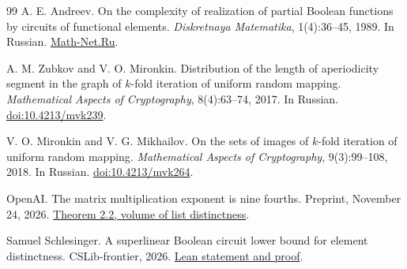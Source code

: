 \documentclass[11pt]{article}
\theoremstyle{definition}
\theoremstyle{remark}
\numberwithin{equation}{section}
\begin{document}
\begin{thebibliography}{99}
A. E. Andreev.
\newblock On the complexity of realization of partial Boolean functions
by circuits of functional elements.
\newblock \emph{Diskretnaya Matematika}, 1(4):36--45, 1989. In Russian.
\newblock \href{https://www.mathnet.ru/rus/dm939}{Math-Net.Ru}.

A. M. Zubkov and V. O. Mironkin.
\newblock Distribution of the length of aperiodicity segment in the graph
of $k$-fold iteration of uniform random mapping.
\newblock \emph{Mathematical Aspects of Cryptography}, 8(4):63--74, 2017.
In Russian. \href{https://doi.org/10.4213/mvk239}{doi:10.4213/mvk239}.

V. O. Mironkin and V. G. Mikhailov.
\newblock On the sets of images of $k$-fold iteration of uniform random mapping.
\newblock \emph{Mathematical Aspects of Cryptography}, 9(3):99--108, 2018.
In Russian. \href{https://doi.org/10.4213/mvk264}{doi:10.4213/mvk264}.

OpenAI.
\newblock The matrix multiplication exponent is nine fourths.
\newblock Preprint, November 24, 2026.
\href{https://github.com/openai/math/blob/3344da59991ed94f9ba711217b29c1d760badfa6/preprints/The-matrix-multiplication-exponent-is-nine-fourths-November-24-2026/build/obstruction.tex\#L40-L55}{Theorem 2.2, volume of list distinctness}.

Samuel Schlesinger.
\newblock A superlinear Boolean circuit lower bound for element distinctness.
\newblock CSLib-frontier, 2026.
\href{https://github.com/cslib-community/cslib-frontier/blob/f887290e29ffd133d13bb614da7e724d4b2bb8b6/CslibFrontier/Computability/Circuit/Boolean/ElementDistinctness/CircuitLowerBound.lean\#L328-L339}{Lean statement and proof}.

\end{thebibliography}
\end{document}
